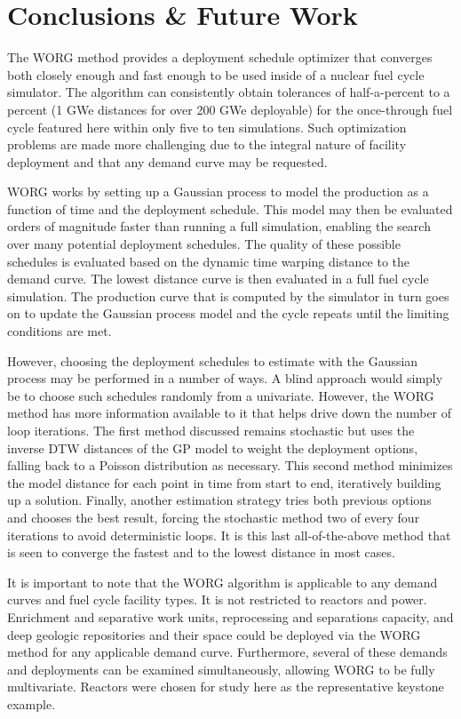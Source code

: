 \section{Conclusions \& Future Work}
\label{conclusion}

The WORG method provides a deployment schedule optimizer that converges
both closely enough and fast enough to be used inside
of a nuclear fuel cycle simulator. The algorithm can consistently obtain
tolerances of half-a-percent to a percent (1 GWe distances for over 200 GWe
deployable) for the once-through fuel cycle featured here within only five to
ten simulations. Such optimization problems are made
more challenging due to the integral nature of facility deployment and
that any demand curve may be requested.

WORG works by setting up a Gaussian process to model the production
as a function of time and the deployment schedule. This model may then
be evaluated orders of magnitude faster than running a full simulation, enabling
the search over many potential deployment schedules. The quality of these
possible schedules is evaluated based on the dynamic time warping distance
to the demand curve. The lowest distance curve is then evaluated in a
full fuel cycle simulation. The production curve that is computed by the
simulator in turn goes on to update the Gaussian process model and the
cycle repeats until the limiting conditions are met.

However, choosing the deployment schedules to estimate with the Gaussian
process may be performed in a number of ways. A blind approach would
simply be to choose such schedules randomly from a univariate. However,
the WORG method has more information available to it that helps drive
down the number of loop iterations. The first method discussed remains
stochastic but uses the inverse DTW distances of the GP model to
weight the deployment options, falling back to a Poisson distribution as
necessary. This second method minimizes the model distance for each point
in time from start to end, iteratively building up a solution. Finally,
another estimation strategy tries both previous options and chooses the
best result, forcing the stochastic method two of every four iterations
to avoid deterministic loops.  It is this last all-of-the-above method
that is seen to converge the fastest and to the lowest distance in most
cases.

It is important to note that the WORG algorithm is applicable to any
demand curves and fuel cycle facility types. It is not restricted to
reactors and power. Enrichment and separative work units, reprocessing
and separations capacity, and deep geologic repositories and their
space could be deployed via the WORG method for any applicable demand
curve. Furthermore, several of these demands and deployments can be
examined simultaneously, allowing WORG to be fully multivariate.
Reactors were chosen for study here as the representative keystone
example.

